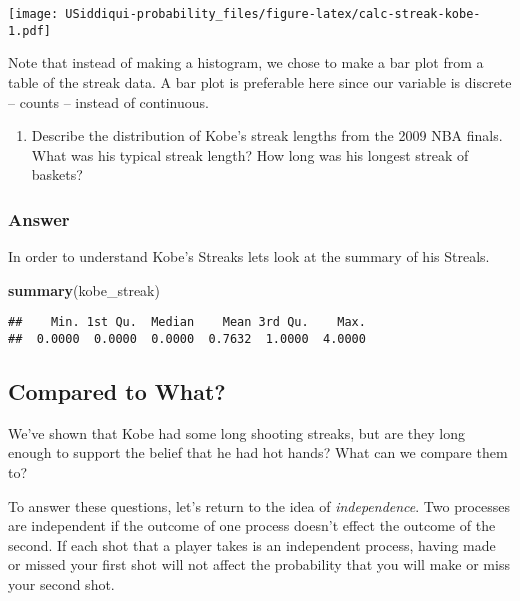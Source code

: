 \documentclass[
]{article}
\newenvironment{Shaded}{\begin{snugshade}}{\end{snugshade}}
\newcommand{\KeywordTok}[1]{\textcolor[rgb]{0.13,0.29,0.53}{\textbf{#1}}}
\newcommand{\NormalTok}[1]{#1}
\providecommand{\tightlist}{%
  \setlength{\itemsep}{0pt}\setlength{\parskip}{0pt}}
\begin{document}
\texttt{[image: USiddiqui-probability\_files/figure-latex/calc-streak-kobe-1.pdf]}

Note that instead of making a histogram, we chose to make a bar plot
from a table of the streak data. A bar plot is preferable here since our
variable is discrete -- counts -- instead of continuous.

\begin{enumerate}
\def\labelenumi{\arabic{enumi}.}
\setcounter{enumi}{1}
\tightlist
\item
  Describe the distribution of Kobe's streak lengths from the 2009 NBA
  finals. What was his typical streak length? How long was his longest
  streak of baskets?
\end{enumerate}

\hypertarget{answer-1}{%
\subsubsection{Answer}\label{answer-1}}

In order to understand Kobe's Streaks lets look at the summary of his
Streals.

\begin{Shaded}
\begin{Highlighting}[]
\KeywordTok{summary}\NormalTok{(kobe_streak)}
\end{Highlighting}
\end{Shaded}

\begin{verbatim}
##    Min. 1st Qu.  Median    Mean 3rd Qu.    Max. 
##  0.0000  0.0000  0.0000  0.7632  1.0000  4.0000
\end{verbatim}

\hypertarget{compared-to-what}{%
\subsection{Compared to What?}\label{compared-to-what}}

We've shown that Kobe had some long shooting streaks, but are they long
enough to support the belief that he had hot hands? What can we compare
them to?

To answer these questions, let's return to the idea of
\emph{independence}. Two processes are independent if the outcome of one
process doesn't effect the outcome of the second. If each shot that a
player takes is an independent process, having made or missed your first
shot will not affect the probability that you will make or miss your
second shot.
\end{document}
